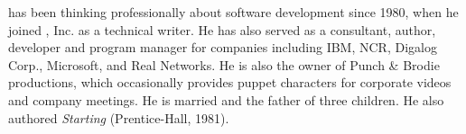 
\cleardoublepage
\setcounter{page}{1}


\cleardoublepage
\vspace*{100pt}
\noindent {} has been thinking professionally about
software development since 1980, when he joined \Forth{}, Inc. as a
technical writer. He has also served as a consultant, author,
developer and program manager for companies including IBM, NCR,
Digalog Corp., Microsoft, and Real Networks.  He is also the owner of
Punch \& Brodie productions, which occasionally provides puppet
characters for corporate videos and company meetings. He is married
and the father of three children. He also authored \emph{Starting \Forth{}}
(Prentice-Hall, 1981).


